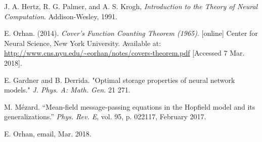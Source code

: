 \begin{thebibliography}{9}
J. A. Hertz, R. G. Palmer, and A. S. Krogh,
\textit{Introduction to the Theory of Neural Computation}.
Addison-Wesley, 1991.

E. Orhan. (2014).
\textit{Cover’s Function Counting Theorem (1965)}. [online] Center for Neural Science, New York University. Available at:
\url{http://www.cns.nyu.edu/~eorhan/notes/covers-theorem.pdf} [Accessed 7 Mar. 2018].

E. Gardner and B. Derrida.
"Optimal storage properties of neural network models." \textit{J. Phys. A: Math. Gen.} 21 271.

M. Mézard.
“Mean-field message-passing equations in the Hopfield model and its generalizations.”
\textit{Phys. Rev. E}, vol. 95, p. 022117, February 2017.

E. Orhan, email, Mar. 2018.

\end{thebibliography}